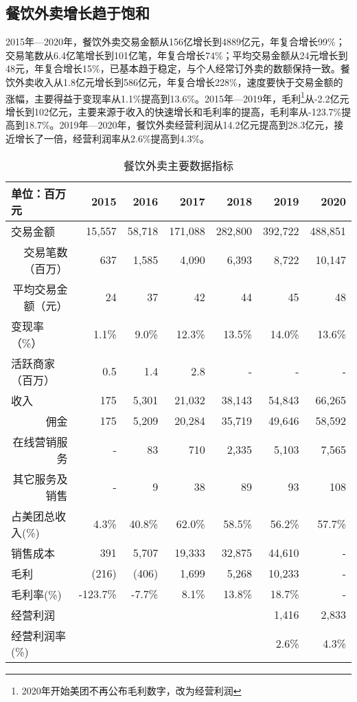 \documentclass[UTF8,a4paper,12pt,lang=cn,fontset = windows]{elegantpaper} %
\begin{document}
\subsection{餐饮外卖增长趋于饱和}
2015年—2020年，餐饮外卖交易金额从156亿增长到4889亿元，年复合增长99\%；交易笔数从6.4亿笔增长到101亿笔，年复合增长74\%；平均交易金额从24元增长到48元，年复合增长15\%，已基本趋于稳定，与个人经常订外卖的数额保持一致。餐饮外卖收入从1.8亿元增长到586亿元，年复合增长228\%，速度要快于交易金额的涨幅，主要得益于变现率从1.1\%提高到13.6\%。2015年—2019年，毛利\footnote{2020年开始美团不再公布毛利数字，改为经营利润}从-2.2亿元增长到102亿元，主要来源于收入的快速增长和毛利率的提高，毛利率从-123.7\%提高到18.7\%。2019年—2020年，餐饮外卖经营利润从14.2亿元提高到28.3亿元，接近增长了一倍，经营利润率从2.6\%提高到4.3\%。

\begin{table}[htbp]
    \small
    \centering
    \caption{餐饮外卖主要数据指标\label{tab:waimai}}
    \begin{tabular}{lrrrrrr}
      \toprule
      单位：百万元 & 2015  & 2016  & 2017  & 2018  & 2019  & 2020 \\
      \midrule
      交易金额  & 15,557  & 58,718  & 171,088  & 282,800  & 392,722  & 488,851  \\
      \multicolumn{1}{r}{交易笔数（百万）} & 637   & 1,585  & 4,090  & 6,393  & 8,722  & 10,147  \\
      \multicolumn{1}{r}{平均交易金额（元）} & 24    & 37    & 42    & 44    & 45    & 48 \\
      变现率（\%） & 1.1\% & 9.0\% & 12.3\% & 13.5\% & 14.0\% & 13.6\% \\
      活跃商家（百万） & 0.5   & 1.4   & 2.8   &           -    &           -    &             -    \\
      收入    & 175   & 5,301  & 21,032  & 38,143  & 54,843  & 66,265  \\
      \multicolumn{1}{r}{佣金} & 175   & 5,209  & 20,284  & 35,719  & 49,646  & 58,592  \\
      \multicolumn{1}{r}{在线营销服务} &            -    & 83    & 710   & 2,335  & 5,103  & 7,565  \\
      \multicolumn{1}{r}{其它服务及销售} &            -    & 9     & 38    & 89    & 93    & 108  \\
      占美团总收入(\%) & 4.3\% & 40.8\% & 62.0\% & 58.5\% & 56.2\% & 57.7\% \\
      销售成本  & 391   & 5,707  & 19,333  & 32,875  & 44,610  &             -    \\
      毛利    & (216) & (406) & 1,699  & 5,268  & 10,233  &             -    \\
      毛利率(\%) & -123.7\% & -7.7\% & 8.1\% & 13.8\% & 18.7\% &             -    \\
      经营利润  &       &       &       &       & 1,416  & 2,833  \\
      经营利润率(\%) &       &       &       &       & 2.6\% & 4.3\% \\
      \bottomrule
      \end{tabular}%
  \end{table}%
\end{document}
